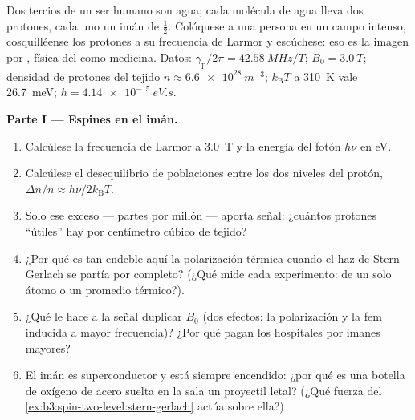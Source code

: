 \begin{problem}\label{pb:b3:spin-two-level:1}
Dos tercios de un ser humano son agua; cada molécula de agua lleva dos
protones, cada uno un imán de  $\tfrac12$. Colóquese a una persona en un
campo intenso, cosquilléense los protones a su frecuencia de Larmor y escúchese:
eso es la imagen por , física del  como medicina.
Datos: $\gamma_{\text{p}}/2\pi = \qty{42.58}{MHz/T}$; $B_0 = \qty{3.0}{T}$;
densidad de protones del tejido $n \approx \qty{6.6e28}{m^{-3}}$;
$k_{\text{B}}T$ a \qty{310}{K} vale \qty{26.7}{meV}; $h =
\qty{4.14e-15}{eV.s}$.

\medskip\noindent\textbf{Parte I --- Espines en el imán.}
\begin{enumerate}
  \item Calcúlese la frecuencia de Larmor a \qty{3.0}{T} y la energía del
        fotón $h\nu$ en eV.
  \item Calcúlese el desequilibrio de poblaciones entre los dos niveles del
        protón, $\Delta n/n \approx h\nu/2k_{\text{B}}T$.
  \item Solo ese exceso --- partes por millón --- aporta
        señal: ¿cuántos protones ``útiles'' hay por centímetro cúbico de
        tejido?
  \item ¿Por qué es tan endeble aquí la polarización térmica cuando el
        haz de Stern--Gerlach se partía por completo? (¿Qué mide cada
        experimento:  de un solo átomo o un promedio
        térmico?).
  \item ¿Qué le hace a la señal duplicar $B_0$ (dos efectos: la
        polarización y la fem inducida a mayor frecuencia)? ¿Por qué pagan
        los hospitales por imanes mayores?
  \item El imán es superconductor y está siempre encendido: ¿por qué es
        una botella de oxígeno de acero suelta en la sala un proyectil
        letal? (¿Qué fuerza del
        \cref{ex:b3:spin-two-level:stern-gerlach} actúa sobre ella?)
\end{enumerate}


\end{problem}

